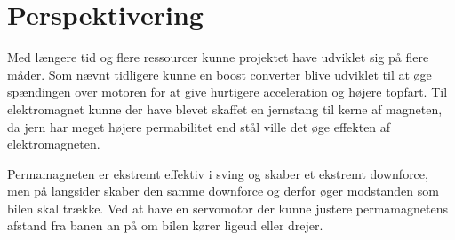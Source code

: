 \section{Perspektivering}
Med længere tid og flere ressourcer kunne projektet have udviklet sig på flere måder. Som nævnt tidligere kunne en boost converter blive udviklet til at øge spændingen over motoren for at give hurtigere acceleration og højere topfart. Til elektromagnet kunne der have blevet skaffet en jernstang til kerne af magneten, da jern har meget højere permabilitet end stål ville det øge effekten af elektromagneten. 

Permamagneten er ekstremt effektiv i sving og skaber et ekstremt downforce, men på langsider skaber den samme downforce og derfor øger modstanden som bilen skal trække. Ved at have en servomotor der kunne justere permamagnetens afstand fra banen an på om bilen kører ligeud eller drejer. 